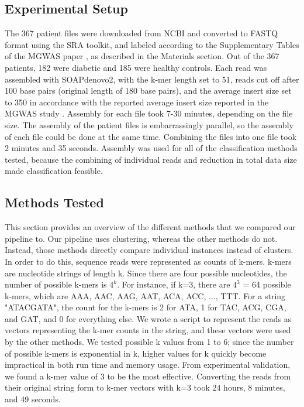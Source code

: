 
\subsection{Experimental Setup}

The 367 patient files were downloaded from NCBI and converted to FASTQ format using the SRA toolkit, and labeled according to the Supplementary Tables of the MGWAS paper \cite{qin041012}, as described in the Materials section. Out of the 367 patients, 182 were diabetic and 185 were healthy controls. Each read was assembled with SOAPdenovo2, with the k-mer length set to 51, reads cut off after 100 base pairs (original length of 180 base pairs), and the average insert size set to 350 in accordance with the reported average insert size reported in the MGWAS study \cite{qin041012}. Assembly for each file took 7-30 minutes, depending on the file size. The assembly of the patient files is embarrassingly parallel, so the assembly of each file could be done at the same time. Combining the files into one file took 2 minutes and 35 seconds. Assembly was used for all of the classification methods tested, because the combining of individual reads and reduction in total data size made classification feasible.

\subsection{Methods Tested}

This section provides an overview of the different methods that we compared our pipeline to. Our pipeline uses clustering, whereas the other methods do not. Instead, those methods directly compare individual instances instead of clusters. In order to do this, sequence reads were represented as counts of k-mers. k-mers are nucleotide strings of length k. Since there are four possible nucleotides, the number of possible k-mers is \(4^k\). For instance, if k=3, there are \(4^3\) = 64 possible k-mers, which are AAA, AAC, AAG, AAT, ACA, ACC, ..., TTT. For a string "ATACGATA", the count for the k-mers is 2 for ATA, 1 for TAC, ACG, CGA, and GAT, and 0 for everything else. We wrote a script to represent the reads as vectors representing the k-mer counts in the string, and these vectors were used by the other methods. We tested possible k values from 1 to 6; since the number of possible k-mers is exponential in k, higher values for k quickly become impractical in both run time and memory usage. From experimental validation, we found a k-mer value of 3 to be the most effective. Converting the reads from their original string form to k-mer vectors with k=3 took 24 hours, 8 minutes, and 49 seconds.

